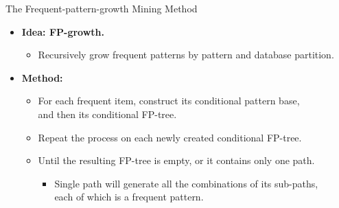 \begin{frame}{The Frequent-pattern-growth Mining Method}
	\centering
	\begin{itemize}
		\item \textbf{Idea: FP-growth.}
		      \begin{itemize}
			      \item Recursively grow frequent patterns by pattern and database
			            partition.
		      \end{itemize}
		\item \textbf{Method:}
		      \begin{itemize}
			      \item For each frequent item, construct its conditional pattern
			            base, \\
			            and then its conditional FP-tree.
			      \item Repeat the process on each newly created conditional FP-tree.
			      \item Until the resulting FP-tree is empty, or it contains only one
			            path.
			            \begin{itemize}
				            \item Single path will generate all the combinations of its
				                  sub-paths, \\
				                  each of which is a frequent pattern.
			            \end{itemize}
		      \end{itemize}
	\end{itemize}
\end{frame}


